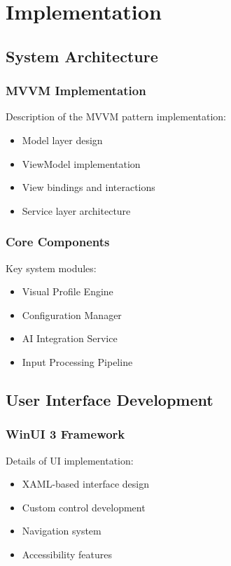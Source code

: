\chapter{Implementation}

\section{System Architecture}
\subsection{MVVM Implementation}
Description of the MVVM pattern implementation:
\begin{itemize}
    \item Model layer design
    \item ViewModel implementation
    \item View bindings and interactions
    \item Service layer architecture
\end{itemize}

\subsection{Core Components}
Key system modules:
\begin{itemize}
    \item Visual Profile Engine
    \item Configuration Manager
    \item AI Integration Service
    \item Input Processing Pipeline
\end{itemize}

\section{User Interface Development}
\subsection{WinUI 3 Framework}
Details of UI implementation:
\begin{itemize}
    \item XAML-based interface design
    \item Custom control development
    \item Navigation system
    \item Accessibility features
\end{itemize}


